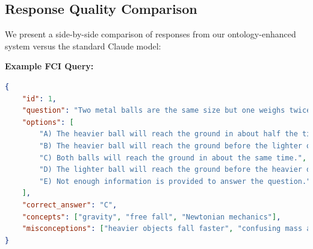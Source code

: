 \subsection{Response Quality Comparison}
\label{subsec:response-comparison}

We present a side-by-side comparison of responses from our ontology-enhanced system versus the standard Claude model:

\textbf{Example FCI Query:}

\begin{lstlisting}[language=json, basicstyle=\ttfamily]
{
    "id": 1,
    "question": "Two metal balls are the same size but one weighs twice as much as the other. The balls are dropped from the roof of a single story building at the same instant. The time it takes the balls to reach the ground will be:",
    "options": [
        "A) The heavier ball will reach the ground in about half the time of the lighter one.",
        "B) The heavier ball will reach the ground before the lighter one, but not in half the time.",
        "C) Both balls will reach the ground in about the same time.",
        "D) The lighter ball will reach the ground before the heavier one.",
        "E) Not enough information is provided to answer the question."
    ],
    "correct_answer": "C",
    "concepts": ["gravity", "free fall", "Newtonian mechanics"],
    "misconceptions": ["heavier objects fall faster", "confusing mass and weight"]
}
\end{lstlisting}

